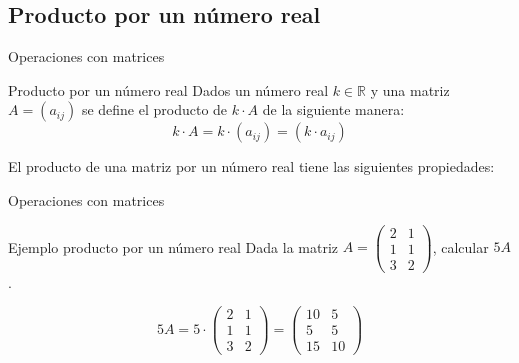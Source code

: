 \documentclass[9pt]{beamer}
\newcommand{\R}{\mathbb{R}}
\begin{document}
\subsection{Producto por un número real}

\begin{frame}{Operaciones con matrices}


\begin{alertblock}{Producto por un número real}
Dados un número real $k\in \R$ y una matriz $A=(a_{ij})$ se define el producto de $k\cdot A$ de la siguiente manera:
\[ k\cdot A=k\cdot (a_{ij})= (k\cdot a_{ij})\]
\end{alertblock}
\pause
El producto de una matriz por un número real tiene las siguientes propiedades:

\end{frame}

\begin{frame}{Operaciones con matrices}

\begin{exampleblock}{Ejemplo producto por un número real}
Dada la matriz $A=\begin{pmatrix}
	2 & 1 \\
	1 & 1 \\
	3 & 2
\end{pmatrix}$, calcular $5A$.
\end{exampleblock}
\pause

 \[ 5A=5\cdot\begin{pmatrix}
	2 & 1 \\
	1 & 1 \\
	3 & 2
\end{pmatrix}= \begin{pmatrix}
	10 & 5 \\
	5 & 5 \\
	15 & 10
\end{pmatrix}  \]
\end{frame}
\end{document}

